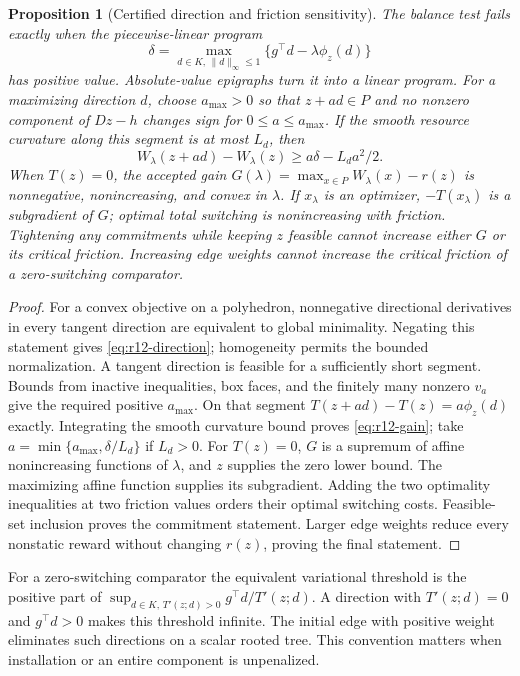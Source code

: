 \documentclass[11pt,letterpaper]{article}
\newtheorem{proposition}[theorem]{Proposition}
\theoremstyle{definition}
\newcommand{\1}{\mathbf 1}
\begin{document}
\begin{proposition}[Certified direction and friction sensitivity]\label{prop:r12-direction}
The balance test fails exactly when the piecewise-linear program
\begin{equation}\label{eq:r12-direction}
 \delta=\max_{d\in K,\,\|d\|_\infty\leq1}
                   \{g^\top d-\lambda\phi_z(d)\}
\end{equation}
has positive value. Absolute-value epigraphs turn it into a linear program. For a maximizing direction $d$, choose $a_{\max}>0$ so that $z+ad\in P$ and no nonzero component of $Dz-h$ changes sign for $0\leq a\leq a_{\max}$. If the smooth resource curvature along this segment is at most $L_d$, then
\begin{equation}\label{eq:r12-gain}
 W_\lambda(z+ad)-W_\lambda(z)\geq a\delta-L_da^2/2.
\end{equation}
When $T(z)=0$, the accepted gain $G(\lambda)=\max_{x\in P}W_\lambda(x)-r(z)$ is nonnegative, nonincreasing, and convex in $\lambda$. If $x_\lambda$ is an optimizer, $-T(x_\lambda)$ is a subgradient of $G$; optimal total switching is nonincreasing with friction. Tightening any commitments while keeping $z$ feasible cannot increase either $G$ or its critical friction. Increasing edge weights cannot increase the critical friction of a zero-switching comparator.
\end{proposition}
\begin{proof}
For a convex objective on a polyhedron, nonnegative directional derivatives in every tangent direction are equivalent to global minimality. Negating this statement gives \eqref{eq:r12-direction}; homogeneity permits the bounded normalization. A tangent direction is feasible for a sufficiently short segment. Bounds from inactive inequalities, box faces, and the finitely many nonzero $v_a$ give the required positive $a_{\max}$. On that segment $T(z+ad)-T(z)=a\phi_z(d)$ exactly. Integrating the smooth curvature bound proves \eqref{eq:r12-gain}; take $a=\min\{a_{\max},\delta/L_d\}$ if $L_d>0$. For $T(z)=0$, $G$ is a supremum of affine nonincreasing functions of $\lambda$, and $z$ supplies the zero lower bound. The maximizing affine function supplies its subgradient. Adding the two optimality inequalities at two friction values orders their optimal switching costs. Feasible-set inclusion proves the commitment statement. Larger edge weights reduce every nonstatic reward without changing $r(z)$, proving the final statement.
\end{proof}
For a zero-switching comparator the equivalent variational threshold is the positive part of $\sup_{d\in K,\,T'(z;d)>0}g^\top d/T'(z;d)$. A direction with $T'(z;d)=0$ and $g^\top d>0$ makes this threshold infinite. The initial edge with positive weight eliminates such directions on a scalar rooted tree. This convention matters when installation or an entire component is unpenalized.
\end{document}
